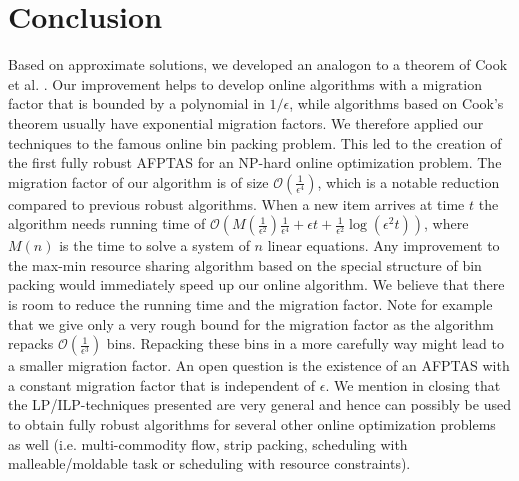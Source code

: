 \documentclass[a4paper,11pt]{article}
\begin{document}
\section{Conclusion}
Based on approximate solutions, we developed an analogon to a theorem of Cook et al. \cite{cook1986sensitivity}. 
Our improvement
helps to develop online algorithms with a migration factor that is bounded by a polynomial
in $1/ \epsilon$, while algorithms based on Cook's theorem usually have exponential migration factors. 
We therefore applied our techniques to the famous online bin packing problem.
This led to the creation of the first fully robust AFPTAS for an NP-hard online optimization problem.
The migration factor of our algorithm is of size $\mathcal{O}(\frac{1}{\epsilon^4})$, which is a notable 
reduction compared to previous robust algorithms.
When a new item arrives at time $t$ the algorithm needs
running time of $\mathcal{O}(M(\frac{1}{\epsilon^2}) \frac{1}{\epsilon^4} +
\epsilon t + \frac{1}{\epsilon^2}\log(\epsilon^2 t))$, where $M(n)$ is the time to solve a system 
of $n$ linear equations.
Any improvement to the max-min resource sharing algorithm based on the special structure of bin packing would 
immediately speed up our online algorithm. We believe that there is room to reduce
the running time and the migration factor. Note for example that we give only a very rough bound for the
migration factor as the algorithm repacks $\mathcal{O}(\frac{1}{\epsilon^3})$ bins. Repacking these bins in a more
carefully way might lead to a smaller migration factor.
An open question is the existence of an 
AFPTAS with a constant migration factor that is 
independent of $\epsilon$.
We mention in closing that the LP/ILP-techniques presented are very general and hence can possibly be used
to obtain
fully robust algorithms for several other online optimization problems as well (i.e. multi-commodity flow, 
strip packing, scheduling with malleable/moldable task or scheduling with resource constraints).



\end{document}

